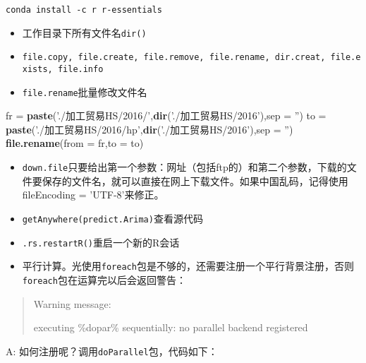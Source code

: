 \documentclass[
]{book}
\newenvironment{Shaded}{\begin{snugshade}}{\end{snugshade}}
\newcommand{\DataTypeTok}[1]{\textcolor[rgb]{0.13,0.29,0.53}{#1}}
\newcommand{\DecValTok}[1]{\textcolor[rgb]{0.00,0.00,0.81}{#1}}
\newcommand{\KeywordTok}[1]{\textcolor[rgb]{0.13,0.29,0.53}{\textbf{#1}}}
\newcommand{\NormalTok}[1]{#1}
\newcommand{\OperatorTok}[1]{\textcolor[rgb]{0.81,0.36,0.00}{\textbf{#1}}}
\newcommand{\StringTok}[1]{\textcolor[rgb]{0.31,0.60,0.02}{#1}}
\providecommand{\tightlist}{%
  \setlength{\itemsep}{0pt}\setlength{\parskip}{0pt}}
\begin{document}
\begin{verbatim}
conda install -c r r-essentials
\end{verbatim}

\begin{itemize}
\tightlist
\item
  工作目录下所有文件名\texttt{dir()}
\item
  \texttt{file.copy,\ file.create,\ file.remove,\ file.rename,\ dir.creat,\ file.exists,\ file.info}
\item
  \texttt{file.rename}批量修改文件名
\end{itemize}

\begin{Shaded}
\begin{Highlighting}[]
\NormalTok{fr =}\StringTok{ }\KeywordTok{paste}\NormalTok{(}\StringTok{'./加工贸易HS/2016/'}\NormalTok{,}\KeywordTok{dir}\NormalTok{(}\StringTok{'./加工贸易HS/2016'}\NormalTok{),}\DataTypeTok{sep =} \StringTok{''}\NormalTok{)}
\NormalTok{to =}\StringTok{ }\KeywordTok{paste}\NormalTok{(}\StringTok{'./加工贸易HS/2016/hp'}\NormalTok{,}\KeywordTok{dir}\NormalTok{(}\StringTok{'./加工贸易HS/2016'}\NormalTok{),}\DataTypeTok{sep =} \StringTok{''}\NormalTok{)}
\KeywordTok{file.rename}\NormalTok{(}\DataTypeTok{from =}\NormalTok{ fr,}\DataTypeTok{to =}\NormalTok{ to)}
\end{Highlighting}
\end{Shaded}

\begin{itemize}
\tightlist
\item
  \texttt{down.file}只要给出第一个参数：网址（包括ftp的）和第二个参数，下载的文件要保存的文件名，就可以直接在网上下载文件。如果中国乱码，记得使用fileEncoding = 'UTF-8'来修正。
\item
  \texttt{getAnywhere(predict.Arima)}查看源代码
\item
  \texttt{.rs.restartR()}重启一个新的R会话
\item
  平行计算。光使用\texttt{foreach}包是不够的，还需要注册一个平行背景注册，否则\texttt{foreach}包在运算完以后会返回警告：
\end{itemize}

\begin{quote}
Warning message:

executing \%dopar\% sequentially: no parallel backend registered
\end{quote}

A: 如何注册呢？调用\texttt{doParallel}包，代码如下：

\begin{Shaded}
\end{Shaded}
\end{document}
